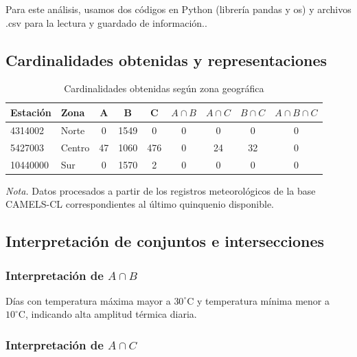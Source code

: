 \documentclass[12pt]{article}
\begin{document}
Para este análisis, usamos dos códigos en Python (librería pandas y os) y archivos .csv para la lectura y guardado de información..

\subsection{Cardinalidades obtenidas y representaciones}

\begin{table}[htbp]
    \centering
    \caption{Cardinalidades obtenidas según zona geográfica}
    \label{tab:cardinalidades}
    \vspace{0.8cm} %
    
    \begin{tabular}{llccccccc}
        \toprule
        \textbf{Estación} & \textbf{Zona} & \textbf{A} & \textbf{B} & \textbf{C} & $A \cap B$ & $A \cap C$ & $B \cap C$ & $A \cap B \cap C$ \\
        \midrule
        4314002  & Norte  & 0 & 1549 & 0 & 0 & 0 & 0 & 0 \\
        5427003  & Centro & 47  & 1060  & 476 & 0  & 24  & 32  & 0  \\
        10440000 & Sur    & 0 & 1570 & 2 & 0 & 0 & 0 & 0 \\
        \bottomrule
    \end{tabular}
    \vspace{0.5cm}
    
    \raggedright
    \small \textit{Nota.} Datos procesados a partir de los registros meteorológicos de la base CAMELS-CL correspondientes al último quinquenio disponible.
\end{table}

\subsection{Interpretación de conjuntos e intersecciones}
\subsubsection{Interpretación de $A \cap B$}

Días con temperatura máxima mayor a $30^{\circ}\text{C}$ y temperatura mínima menor a $10^{\circ}\text{C}$, indicando alta amplitud térmica diaria.

\subsubsection{Interpretación de $A \cap C$}
\end{document}
